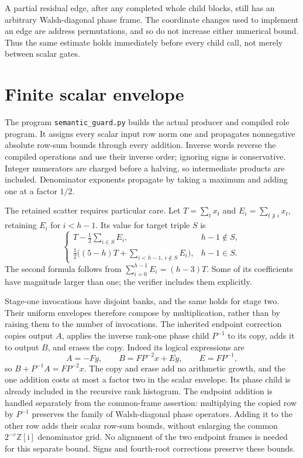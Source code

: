 \documentclass[11pt]{article}
\newcommand{\ii}{\mathrm i}
\newcommand{\Z}{\mathbb Z}
\begin{document}
A partial residual edge, after any completed whole child blocks, still has
an arbitrary Walsh-diagonal phase frame. The coordinate changes used to
implement an edge are address permutations, and so do not increase either
numerical bound. Thus the same estimate holds immediately before every
child call, not merely between scalar gates.

\section{Finite scalar envelope}
The program \texttt{semantic\_guard.py} builds the actual producer and
compiled role program. It assigns every scalar input row norm one and
propagates nonnegative absolute row-sum bounds through every addition.
Inverse words reverse the compiled operations and use their inverse order;
ignoring signs is conservative. Integer numerators are charged before a
halving, so intermediate products are included. Denominator exponents
propagate by taking a maximum and adding one at a factor $1/2$.

The retained scatter requires particular care. Let
$T=\sum_t x_t$ and $E_i=\sum_{t\not\ni i}x_t$, retaining $E_i$ for
$i<h-1$. Its value for target triple $S$ is
\[
 \begin{cases}
 T-\frac12\sum_{i\in S}E_i,&h-1\notin S,\\[2pt]
 \frac12\bigl((5-h)T+\sum_{i<h-1,\ i\notin S}E_i\bigr),&h-1\in S.
 \end{cases}
\]
The second formula follows from $\sum_{i=0}^{h-1}E_i=(h-3)T$.
Some of its coefficients have magnitude larger than one; the verifier
includes them explicitly.

Stage-one invocations have disjoint banks, and the same holds for stage two.
Their uniform envelopes therefore compose by multiplication, rather than
by raising them to the number of invocations. The inherited endpoint
correction copies output $A$, applies the inverse rank-one phase child
$P^{-1}$ to its copy, adds it to output $B$, and erases the copy.
Indeed its logical expressions are
\[
 A=-Fy,\qquad B=FP^{-2}x+Ey,\qquad E=FP^{-1},
\]
so $B+P^{-1}A=FP^{-2}x$. The copy and erase add no arithmetic growth,
and the one addition costs at most a factor two in the scalar envelope.
Its phase child is already included in the recursive rank histogram.
The endpoint addition is handled separately from the common-frame assertion:
multiplying the copied row by $P^{-1}$ preserves the family of Walsh-diagonal
phase operators. Adding it to the other row adds their scalar row-sum bounds,
without enlarging the common $2^{-e}\Z[\ii]$ denominator grid. No alignment
of the two endpoint frames is needed for this separate bound.
Signs and fourth-root corrections preserve these bounds.
\end{document}
